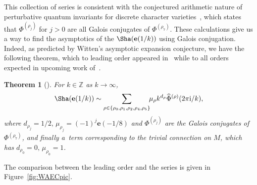 \documentclass[pdftex]{sigma}
\numberwithin{equation}{section}
\newtheorem{Theorem}{Theorem}[section]
\def\BZ{\mathbb{Z}}
\def\e{\mathbf e}
\def\WRT{\Sha}
\def\BZ{\mathbb Z}
\def\triv{\rho_0}
\begin{document}
This collection of series is consistent with the conjectured arithmetic nature of perturbative quantum invariants for discrete character varieties~\cite{DGLZ,Gar:resCS}, which states that $\Phi^{(\rho_j)}$ for $j>0$ are all Galois conjugates of $\Phi^{(\rho_7)}$. These calculations give us a way to find the asymptotics of the $\WRT(\e(1/k))$ using Galois conjugation. Indeed, as predicted by Witten's asymptotic expansion conjecture, we have the following theorem, which to leading order appeared in~\cite{CharlesMarche} while to all orders expected in upcoming work of~\cite{AM:asymp}.
\begin{Theorem}[\cite{AM:asymp,CharlesMarche}]\label{thm:WAEC}
For $k\in\BZ$ as $k\rightarrow\infty$,
\[
 \WRT(\e(1/k))
 \sim
 \sum_{\rho\in\{\rho_0,\rho_1,\rho_2,\rho_4,\rho_5\}}\!\!\mu_{\rho}k^{d_\rho}\widehat{\Phi}^{(\rho)}(2\pi {\rm i}/k) ,
\]
where $d_{\rho_j}=1/2,\,\mu_{\rho_j}=(-1)^j\e(-1/8)$ and $\Phi^{(\rho_j)}$ are the Galois conjugates of $\Phi^{(\rho_7)}$, and finally a~term corresponding to the trivial connection on $M$, which has $d_{\triv}=0,\,\mu_{\rho_0}=1$.
\end{Theorem}
The comparison between the leading order and the series is given in Figure~\ref{fig:WAECpic}.
\end{document}
